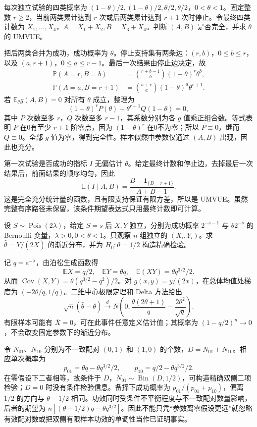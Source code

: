 \documentclass[UTF8,12pt,a4paper,fontset=fandol]{ctexbook}
\newcommand{\E}{\mathbb E}
\newcommand{\PP}{\mathbb P}
\DeclareMathOperator{\Cov}{Cov}
\begin{document}
\begin{example}[原题5：双边停止抽样下的完全性与无偏估计]\label{yau:2023-5}
每次独立试验的四类概率为 $(1-\theta)/2,(1-\theta)/2,\theta/2,\theta/2$，$0<\theta<1$。固定整数 $r\ge2$，当前两类累计达到 $r$ 次或后两类累计达到 $r+1$ 次时停止。令最终四类计数为 $X_1,\ldots,X_4$，$A=X_1+X_2,B=X_3+X_4$。判断 $(A,B)$ 是否完全，并求 $\theta$ 的 UMVUE。
\end{example}
\begin{solve}
把后两类合并为成功，成功概率为 $\theta$。停止支持集有两条边：$(r,b)$，$0\le b\le r$，以及 $(a,r+1)$，$0\le a\le r-1$。最后一次结果由停止边决定，故
\[
\begin{aligned}
\PP(A=r,B=b)&=\binom{r+b-1}{b}(1-\theta)^r\theta^b,\\
\PP(A=a,B=r+1)&=\binom{a+r}{a}(1-\theta)^a\theta^{r+1}.
\end{aligned}
\]
若 $\E_\theta g(A,B)=0$ 对所有 $\theta$ 成立，整理为
\[
(1-\theta)^rP(\theta)+\theta^{r+1}Q(1-\theta)=0,
\]
其中 $P$ 次数至多 $r$，$Q$ 次数至多 $r-1$，其系数分别为各 $g$ 值乘正组合数。等式表明 $P$ 在0有至少 $r+1$ 阶零点，因为 $(1-\theta)^r$ 在0不为零；所以 $P\equiv0$，继而 $Q\equiv0$。全部 $g$ 值为零，得到完全性。样本似然中参数仅通过 $(A,B)$ 出现，因此也充分。

第一次试验是否成功的指标 $I$ 无偏估计 $\theta$。给定最终计数和停止边，去掉最后一次结果后，前面结果的顺序均匀，因此
\[
\E(I\mid A,B)=\frac{B-\mathbf1_{\{B=r+1\}}}{A+B-1}.
\]
这是完全充分统计量的函数，且有限支持保证有限方差，所以是 UMVUE。虽然完整有序路径未保留，该条件期望表达式只用最终计数即可计算。
\end{solve}

\begin{example}[原题6：潜在泊松混合中的比率估计与精确检验]\label{yau:2023-6}
设 $S\sim\operatorname{Pois}(2\lambda)$，给定 $S=s$ 后 $X,Y$ 独立，分别为成功概率 $2^{-s-1}$ 与 $\theta2^{-s}$ 的 Bernoulli 变量，$\lambda>0,0<\theta<1$。只观察 $n$ 组独立的 $(X_i,Y_i)$。求 $\widehat\theta=\bar Y/(2\bar X)$ 的渐近分布，并为 $H_0:\theta=1/2$ 构造精确检验。
\end{example}
\begin{solve}
记 $q=e^{-\lambda}$，由泊松生成函数得
\[
\E X=q/2,\quad\E Y=\theta q,\quad\E(XY)=\theta q^{3/2}/2.
\]
从而 $\Cov(X,Y)=\theta(q^{3/2}-q^2)/2$。对 $g(x,y)=y/(2x)$，在总体均值处梯度为 $(-2\theta/q,1/q)$。二维中心极限定理和 Delta 方法给出
\[
\sqrt n(\widehat\theta-\theta)\xrightarrow d
N\left(0,\frac{\theta(2\theta+1)}q-\frac{2\theta^2}{\sqrt q}\right).
\]
有限样本可能有 $\bar X=0$，可在此事件任意定义估计值；其概率为 $(1-q/2)^n\to0$，不会改变固定参数下的渐近分布。

令 $N_{01}$、$N_{10}$ 分别为不一致配对 $(0,1)$ 和 $(1,0)$ 的个数，$D=N_{01}+N_{10}$。相应单次概率为
\[
p_{01}=\theta q-\theta q^{3/2}/2,\qquad p_{10}=q/2-\theta q^{3/2}/2.
\]
在零假设下二者相等，故条件于 $D$，$N_{01}\sim\operatorname{Bin}(D,1/2)$，可构造精确双侧二项检验；$D=0$ 时没有条件检验信息。备择下成功概率为 $p_{01}/(p_{01}+p_{10})$，偏离 $1/2$ 的方向与 $\theta-1/2$ 相同。功效同时受条件不平衡程度与不一致配对数量影响，后者的期望为 $n[(\theta+1/2)q-\theta q^{3/2}]$。因此不能只凭“参数离零假设更远”就忽略有效配对数或把双侧有限样本功效的单调性当作已证明事实。
\end{solve}
\end{document}
